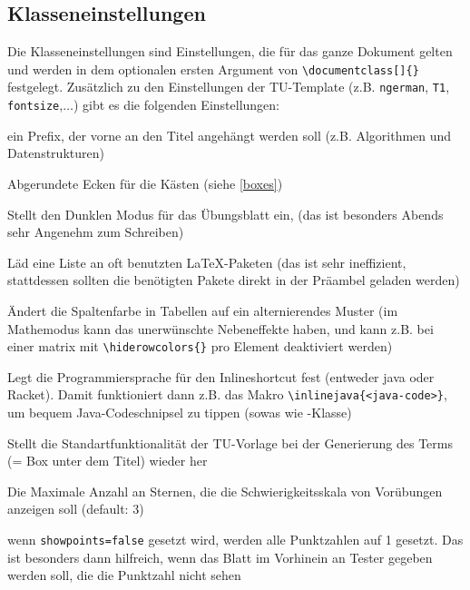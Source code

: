 \documentclass[
    titleprefix=AlgoTeX,
    inlineshortcut=java,
    corporatedesign,
    boxarc,
]{algoexercise}
\begin{document}
    \subsection{Klasseneinstellungen}\label{Klasseneinstellungen}
    \vspace{-1em}
    Die Klasseneinstellungen sind Einstellungen, die für das ganze Dokument gelten und werden in dem optionalen ersten Argument von
    \verb+\documentclass[]{}+ festgelegt.
    Zusätzlich zu den Einstellungen der TU-Template (z.B. \verb+ngerman+, \verb+T1+, \verb+fontsize+,$\ldots$) gibt es die folgenden
    Einstellungen:
    \begin{description}[leftmargin = 3cm]
        \item[titleprefix] ein Prefix, der vorne an den Titel angehängt werden soll
            (z.B. Algorithmen und Datenstrukturen)
        \item[boxarc] Abgerundete Ecken für die Kästen (siehe \ref{boxes})
        \item[dark\_mode]
            Stellt den Dunklen Modus für das Übungsblatt ein, (das ist besonders Abends sehr Angenehm zum Schreiben)
        \item[load\_common] Läd
            eine Liste an oft benutzten \LaTeX{}-Paketen (das ist sehr ineffizient, stattdessen sollten die benötigten Pakete direkt in der
            Präambel geladen werden)
        \item[fancy\_row\_color] Ändert die Spaltenfarbe in Tabellen auf ein alternierendes Muster (im
            Mathemodus kann das unerwünschte Nebeneffekte haben, und kann z.B. bei einer matrix mit \verb+\hiderowcolors{}+ pro Element
            deaktiviert werden)
        \item[inlineshortcut] Legt die Programmiersprache für den Inlineshortcut fest (entweder java oder Racket).
            Damit funktioniert dann z.B. das Makro \verb+\inlinejava{<java-code>}+, um bequem Java-Codeschnipsel zu tippen (sowas wie
            -Klasse)
        \item[manual\_term] Stellt die Standartfunktionalität der TU-Vorlage bei der Generierung des Terms (=
            Box unter dem Titel) wieder her
        \item[maxdifficulty] Die Maximale Anzahl an Sternen, die die Schwierigkeitsskala von Vorübungen
            anzeigen soll (default: 3)
        \item[showpoints] wenn \verb+showpoints=false+ gesetzt wird, werden alle Punktzahlen auf 1 gesetzt.
            Das ist besonders dann hilfreich, wenn das Blatt im Vorhinein an Tester gegeben werden soll, die die Punktzahl nicht sehen

\end{description}
\end{document}
